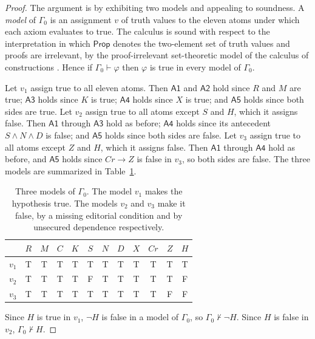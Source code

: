 \documentclass[11pt]{article}
\theoremstyle{plain}
\theoremstyle{definition}
\theoremstyle{remark}
\newcommand{\Hyp}{H}
\newcommand{\Prp}{\mathsf{Prop}}
\begin{document}
\begin{proof}
The argument is by exhibiting two models and appealing to soundness. A \emph{model} of $\Gamma_0$ is an assignment $v$ of truth values to the eleven atoms under which each axiom evaluates to true. The calculus is sound with respect to the interpretation in which $\Prp$ denotes the two-element set of truth values and proofs are irrelevant, by the proof-irrelevant set-theoretic model of the calculus of constructions \cite{miquelwerner2003}. Hence if $\Gamma_0\vdash\varphi$ then $\varphi$ is true in every model of $\Gamma_0$.

Let $v_1$ assign true to all eleven atoms. Then $\mathsf{A1}$ and $\mathsf{A2}$ hold since $R$ and $M$ are true; $\mathsf{A3}$ holds since $K$ is true; $\mathsf{A4}$ holds since $X$ is true; and $\mathsf{A5}$ holds since both sides are true. Let $v_2$ assign true to all atoms except $S$ and $\Hyp$, which it assigns false. Then $\mathsf{A1}$ through $\mathsf{A3}$ hold as before; $\mathsf{A4}$ holds since its antecedent $S\land N\land D$ is false; and $\mathsf{A5}$ holds since both sides are false. Let $v_3$ assign true to all atoms except $Z$ and $\Hyp$, which it assigns false. Then $\mathsf{A1}$ through $\mathsf{A4}$ hold as before, and $\mathsf{A5}$ holds since $\mathit{Cr}\to Z$ is false in $v_3$, so both sides are false. The three models are summarized in Table~\ref{tab:models}.

\begin{table}[ht]
\centering
\small
\begin{tabular}{@{}lccccccccccc@{}}
\toprule
 & $R$ & $M$ & $C$ & $K$ & $S$ & $N$ & $D$ & $X$ & $\mathit{Cr}$ & $Z$ & $\Hyp$ \\
\midrule
$v_1$ & T & T & T & T & T & T & T & T & T & T & T \\
$v_2$ & T & T & T & T & F & T & T & T & T & T & F \\
$v_3$ & T & T & T & T & T & T & T & T & T & F & F \\
\bottomrule
\end{tabular}
\caption{Three models of $\Gamma_0$. The model $v_1$ makes the hypothesis true. The models $v_2$ and $v_3$ make it false, by a missing editorial condition and by unsecured dependence respectively.}
\label{tab:models}
\end{table}

Since $\Hyp$ is true in $v_1$, $\neg\Hyp$ is false in a model of $\Gamma_0$, so $\Gamma_0\not\vdash\neg\Hyp$. Since $\Hyp$ is false in $v_2$, $\Gamma_0\not\vdash\Hyp$. \qedhere
\end{proof}
\end{document}
